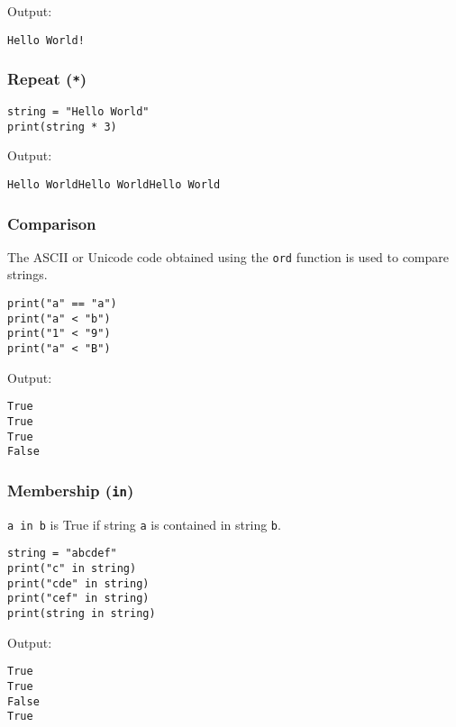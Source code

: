 \documentclass[11pt]{article}
\begin{document}
 \noindent Output:

\begin{verbatim}
Hello World!
\end{verbatim}

\subsubsection{Repeat (\texttt{*})}
\label{sec:org1adfbc8}
\begin{verbatim}
string = "Hello World"
print(string * 3)
\end{verbatim}

 \noindent Output:

\begin{verbatim}
Hello WorldHello WorldHello World
\end{verbatim}

\subsubsection{Comparison}
\label{sec:org0b11a12}
The ASCII or Unicode code obtained using the \texttt{ord} function is used to compare strings.
\begin{verbatim}
print("a" == "a")
print("a" < "b")
print("1" < "9")
print("a" < "B")
\end{verbatim}

 \noindent Output:

\begin{verbatim}
True
True
True
False
\end{verbatim}

\subsubsection{Membership (\texttt{in})}
\label{sec:org53968d4}
\texttt{a in b} is True if string \texttt{a} is contained in string \texttt{b}.
\begin{verbatim}
string = "abcdef"
print("c" in string)
print("cde" in string)
print("cef" in string)
print(string in string)
\end{verbatim}

 \noindent Output:

\begin{verbatim}
True
True
False
True
\end{verbatim}
\end{document}
